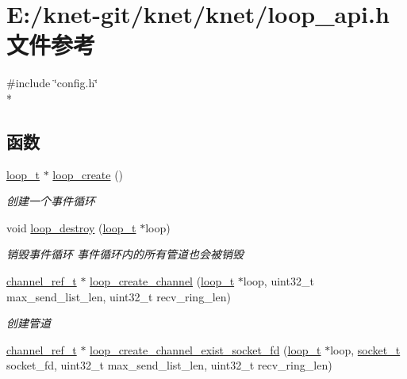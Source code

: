 \hypertarget{a00070}{}\section{E\+:/knet-\/git/knet/knet/loop\+\_\+api.h 文件参考}
\label{a00070}
{\ttfamily \#include \char`\"{}config.\+h\char`\"{}}\\*
\subsection*{函数}
\begin{DoxyCompactItemize}
\item 
\hyperlink{a00050_a9c3ad1cd2de83e09f3a7b59fa82c94ee_a9c3ad1cd2de83e09f3a7b59fa82c94ee}{loop\+\_\+t} $\ast$ \hyperlink{a00104_ga878bf0cd280e0bd183144bb95ca4a7b1_ga878bf0cd280e0bd183144bb95ca4a7b1}{loop\+\_\+create} ()
\begin{DoxyCompactList}\small\item\em 创建一个事件循环 \end{DoxyCompactList}\item 
void \hyperlink{a00104_ga921fd5e5e16a73de123e81baab187a0a_ga921fd5e5e16a73de123e81baab187a0a}{loop\+\_\+destroy} (\hyperlink{a00050_a9c3ad1cd2de83e09f3a7b59fa82c94ee_a9c3ad1cd2de83e09f3a7b59fa82c94ee}{loop\+\_\+t} $\ast$loop)
\begin{DoxyCompactList}\small\item\em 销毁事件循环 事件循环内的所有管道也会被销毁 \end{DoxyCompactList}\item 
\hyperlink{a00050_a151271c9d188ef28d4d24bb81dcc1263_a151271c9d188ef28d4d24bb81dcc1263}{channel\+\_\+ref\+\_\+t} $\ast$ \hyperlink{a00104_gab5b73ea9a0347b431f93ebf30ecd05b5_gab5b73ea9a0347b431f93ebf30ecd05b5}{loop\+\_\+create\+\_\+channel} (\hyperlink{a00050_a9c3ad1cd2de83e09f3a7b59fa82c94ee_a9c3ad1cd2de83e09f3a7b59fa82c94ee}{loop\+\_\+t} $\ast$loop, uint32\+\_\+t max\+\_\+send\+\_\+list\+\_\+len, uint32\+\_\+t recv\+\_\+ring\+\_\+len)
\begin{DoxyCompactList}\small\item\em 创建管道 \end{DoxyCompactList}\item 
\hyperlink{a00050_a151271c9d188ef28d4d24bb81dcc1263_a151271c9d188ef28d4d24bb81dcc1263}{channel\+\_\+ref\+\_\+t} $\ast$ \hyperlink{a00104_ga6879ac453ef83768ce8f8ef43a474409_ga6879ac453ef83768ce8f8ef43a474409}{loop\+\_\+create\+\_\+channel\+\_\+exist\+\_\+socket\+\_\+fd} (\hyperlink{a00050_a9c3ad1cd2de83e09f3a7b59fa82c94ee_a9c3ad1cd2de83e09f3a7b59fa82c94ee}{loop\+\_\+t} $\ast$loop, \hyperlink{a00050_a0d9e0afbf02fb6ed6c5b1415dce51b05_a0d9e0afbf02fb6ed6c5b1415dce51b05}{socket\+\_\+t} socket\+\_\+fd, uint32\+\_\+t max\+\_\+send\+\_\+list\+\_\+len, uint32\+\_\+t recv\+\_\+ring\+\_\+len)

\end{DoxyCompactItemize}
